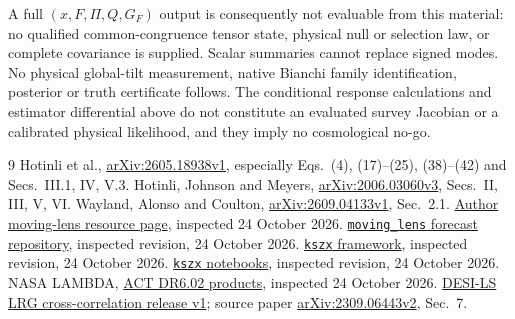 \documentclass[aps,prd,reprint,onecolumn,notitlepage,nofootinbib]{revtex4-2}
\begin{document}
A full $(x,F,\Pi,Q,G_F)$ output is consequently not evaluable from this material: no qualified common-congruence tensor state, physical null or selection law, or complete covariance is supplied. Scalar summaries cannot replace signed modes. No physical global-tilt measurement, native Bianchi family identification, posterior or truth certificate follows. The conditional response calculations and estimator differential above do not constitute an evaluated survey Jacobian or a calibrated physical likelihood, and they imply no cosmological no-go.

\clearpage
\begin{thebibliography}{9}
 Hotinli et al., \href{https://arxiv.org/html/2605.18938v1}{arXiv:2605.18938v1}, especially Eqs.~(4), (17)--(25), (38)--(42) and Secs.~III.1, IV, V.3.
 Hotinli, Johnson and Meyers, \href{https://arxiv.org/html/2006.03060v3}{arXiv:2006.03060v3}, Secs.~II, III, V, VI.
 Wayland, Alonso and Coulton, \href{https://arxiv.org/html/2609.04133v1}{arXiv:2609.04133v1}, Sec.~2.1.
 \href{https://selimhotinli.github.io/movinglenseffect/}{Author moving-lens resource page}, inspected 24 October 2026.
 \href{https://github.com/selimhotinli/moving_lens/tree/9e343c82930f0d8e4366507b5f1759f0559c8f09}{\texttt{moving\_lens} forecast repository}, inspected revision, 24 October 2026.
 \href{https://github.com/kmsmith137/kszx/tree/c64f3fda498b25cc978b2a67909f3c8f916578fd}{\texttt{kszx} framework}, inspected revision, 24 October 2026.
 \href{https://github.com/kmsmith137/kszx_notebooks/tree/9dcce8cb4ce1f1e37074343444f0eae09d2bd046}{\texttt{kszx} notebooks}, inspected revision, 24 October 2026.
 NASA LAMBDA, \href{https://lambda.gsfc.nasa.gov/product/act/act_dr6.02/index.html}{ACT DR6.02 products}, inspected 24 October 2026.
 \href{https://data.desi.lbl.gov/public/papers/c3/lrg_xcorr_2023/v1/}{DESI-LS LRG cross-correlation release v1}; source paper \href{https://arxiv.org/html/2309.06443v2\#S7}{arXiv:2309.06443v2}, Sec.~7.
\end{thebibliography}
\end{document}
